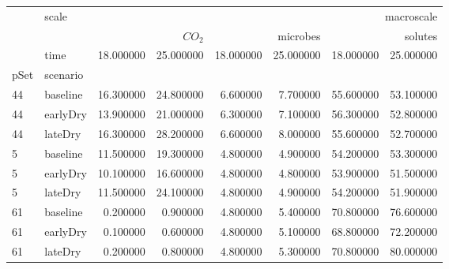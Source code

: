 \begin{tabular}{llrrrrrr}
 & scale & \multicolumn{6}{r}{macroscale} \\
 &  & \multicolumn{2}{r}{$CO_2$} & \multicolumn{2}{r}{microbes} & \multicolumn{2}{r}{solutes} \\
 & time & 18.000000 & 25.000000 & 18.000000 & 25.000000 & 18.000000 & 25.000000 \\
pSet & scenario &  &  &  &  &  &  \\
44 & baseline & 16.300000 & 24.800000 & 6.600000 & 7.700000 & 55.600000 & 53.100000 \\
44 & earlyDry & 13.900000 & 21.000000 & 6.300000 & 7.100000 & 56.300000 & 52.800000 \\
44 & lateDry & 16.300000 & 28.200000 & 6.600000 & 8.000000 & 55.600000 & 52.700000 \\
5 & baseline & 11.500000 & 19.300000 & 4.800000 & 4.900000 & 54.200000 & 53.300000 \\
5 & earlyDry & 10.100000 & 16.600000 & 4.800000 & 4.800000 & 53.900000 & 51.500000 \\
5 & lateDry & 11.500000 & 24.100000 & 4.800000 & 4.900000 & 54.200000 & 51.900000 \\
61 & baseline & 0.200000 & 0.900000 & 4.800000 & 5.400000 & 70.800000 & 76.600000 \\
61 & earlyDry & 0.100000 & 0.600000 & 4.800000 & 5.100000 & 68.800000 & 72.200000 \\
61 & lateDry & 0.200000 & 0.800000 & 4.800000 & 5.300000 & 70.800000 & 80.000000 \\
\end{tabular}
